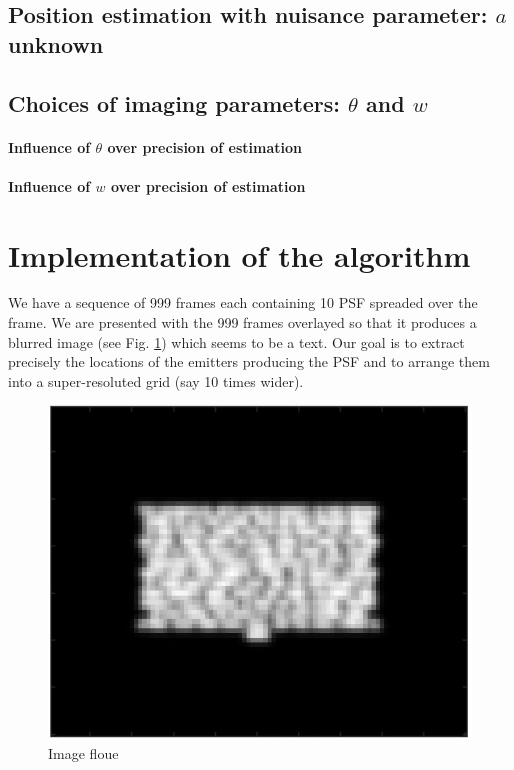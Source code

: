 \documentclass[10pt,letterpaper]{article}
\begin{document}
\subsection{Position estimation with nuisance parameter: $a$ unknown}

\subsection{Choices of imaging parameters: $\theta$ and $w$}
\paragraph{Influence of $\theta$ over precision of estimation}

\paragraph{Influence of $w$ over precision of estimation}

\section{Implementation of the algorithm}

We have a sequence of 999 frames each containing 10 PSF spreaded over the frame. We are presented with the 999 frames overlayed so that it produces a blurred image (see Fig. \ref{fig:floue}) which seems to be a text. Our goal is to extract precisely the locations of the emitters producing the PSF and to arrange them into a super-resoluted grid (say 10 times wider).

\begin{figure}[h]
	\centering
	\includegraphics[scale=0.65]{ImageFloue.JPG}
	\caption{Image floue}
	\label{fig:floue}
\end{figure}
\end{document}
